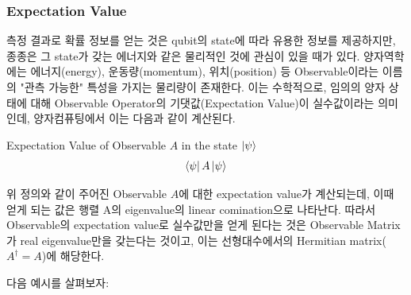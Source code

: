 \subsubsection{Expectation Value}

측정 결과로 확률 정보를 얻는 것은 qubit의 state에 따라 유용한 정보를 제공하지만, 종종은 그 state가 갖는 에너지와 같은 물리적인 것에 관심이 있을 때가 있다. 양자역학에는 에너지(energy), 운동량(momentum), 위치(position) 등 Observable이라는 이름의 "관측 가능한" 특성을 가지는 물리량이 존재한다. 이는 수학적으로, 임의의 양자 상태에 대해 Observable Operator의 기댓값(Expectation Value)이 실수값이라는 의미인데, 양자컴퓨팅에서 이는 다음과 같이 계산된다.
\begin{definition}
    Expectation Value of Observable \(A\) in the state \(\ket \psi\)
    \[
        \bra{\psi}A\ket{\psi}
    \]
\end{definition}

위 정의와 같이 주어진 Observable \(A\)에 대한 expectation value가 계산되는데, 이때 얻게 되는 값은 행렬 A의 eigenvalue의 linear comination으로 나타난다. 따라서 Observable의 expectation value로 실수값만을 얻게 된다는 것은 Observable Matrix가 real eigenvalue만을 갖는다는 것이고, 이는 선형대수에서의 Hermitian matrix(\(A^\dagger = A\))에 해당한다.

\noindent 다음 예시를 살펴보자:

\begin{example}

\end{example}




%
%



%
%
